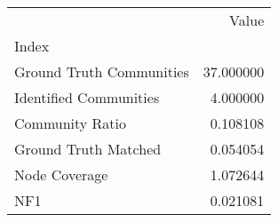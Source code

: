 \begin{tabular}{lr}
\toprule
{} &      Value \\
Index                    &            \\
\midrule
Ground Truth Communities &  37.000000 \\
Identified Communities   &   4.000000 \\
Community Ratio          &   0.108108 \\
Ground Truth Matched     &   0.054054 \\
Node Coverage            &   1.072644 \\
NF1                      &   0.021081 \\
\bottomrule
\end{tabular}
